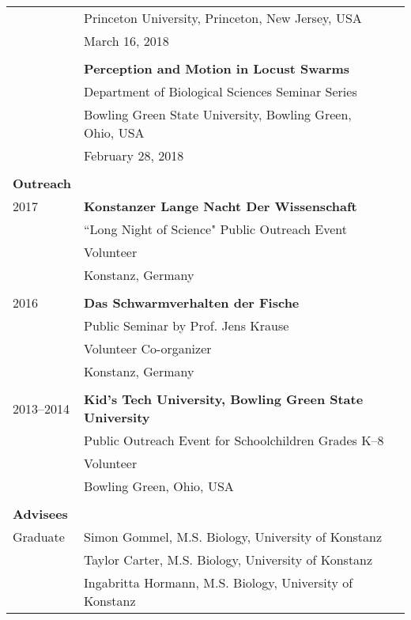 \documentclass[letterpaper,6pt,oneside]{article}
\begin{document}
\begin{small}
\begin{longtable}{@{} l p{5.3in}l}
& Princeton University, Princeton, New Jersey, USA \\
& March 16, 2018 \\
& \\
& \textbf{Perception and Motion in Locust Swarms} \\
& Department of Biological Sciences Seminar Series \\
& Bowling Green State University, Bowling Green, Ohio, USA \\
& February 28, 2018 \\
& \\
 \Large{\textbf{Outreach}}  \vspace{5mm} \\
\large{2017}
& \textbf{Konstanzer Lange Nacht Der Wissenschaft} \\
& ``Long Night of Science" Public Outreach Event \\
& Volunteer \\
& Konstanz, Germany \\
& \\
\large{2016}
& \textbf{Das Schwarmverhalten der Fische} \\
& Public Seminar by Prof. Jens Krause \\
& Volunteer Co-organizer \\
& Konstanz, Germany \\
& \\
\large{2013–2014}
& \textbf{Kid's Tech University, Bowling Green State University} \\
& Public Outreach Event for Schoolchildren Grades K–8 \\
& Volunteer \\
& Bowling Green, Ohio, USA \\
& \\

 \Large{\textbf{Advisees}}  \vspace{5mm} \\
 \large{Graduate} 
 & Simon Gommel, M.S. Biology, University of Konstanz \\
 & Taylor Carter, M.S. Biology, University of Konstanz \\
 & Ingabritta Hormann, M.S. Biology, University of Konstanz \\


\end{longtable}
\end{small}
\end{document}
